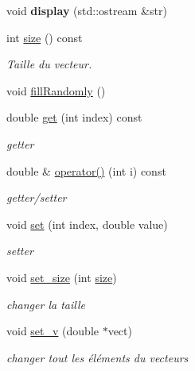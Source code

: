 \begin{DoxyCompactItemize}
\mbox{\label{class_dvector_af66e4bdf60171463c01eea1039eecdb1}} 
void {\bfseries display} (std\+::ostream \&str)
\item 
\mbox{\label{class_dvector_adda9654f389de24c744e897e93f850fb}} 
int \hyperlink{class_dvector_adda9654f389de24c744e897e93f850fb}{size} () const
\begin{DoxyCompactList}\small\item\em Taille du vecteur. \end{DoxyCompactList}\item 
void \hyperlink{class_dvector_a6fecdca0fbad7f928403597e322234b1}{fill\+Randomly} ()
\item 
\mbox{\label{class_dvector_a2e07a00d750b98b10b3413227a7da46d}} 
double \hyperlink{class_dvector_a2e07a00d750b98b10b3413227a7da46d}{get} (int index) const
\begin{DoxyCompactList}\small\item\em getter \end{DoxyCompactList}\item 
double \& \hyperlink{class_dvector_a237ba8b1ca7e68f78ec3f85ae800cbec}{operator()} (int i) const
\begin{DoxyCompactList}\small\item\em getter/setter \end{DoxyCompactList}\item 
void \hyperlink{class_dvector_a2ea1ba5bf87cebf7e74cb0dd94f90e12}{set} (int index, double value)
\begin{DoxyCompactList}\small\item\em setter \end{DoxyCompactList}\item 
void \hyperlink{class_dvector_a5d4b7a3273803031a7fb2b5516e5dd11}{set\+\_\+size} (int \hyperlink{class_dvector_adda9654f389de24c744e897e93f850fb}{size})
\begin{DoxyCompactList}\small\item\em changer la taille \end{DoxyCompactList}\item 
void \hyperlink{class_dvector_a99c6f3bc6f2d285ec2f9d8bd32a32218}{set\+\_\+v} (double $\ast$vect)
\begin{DoxyCompactList}\small\item\em changer tout les éléments du vecteurs \end{DoxyCompactList}\item 

\end{DoxyCompactItemize}
